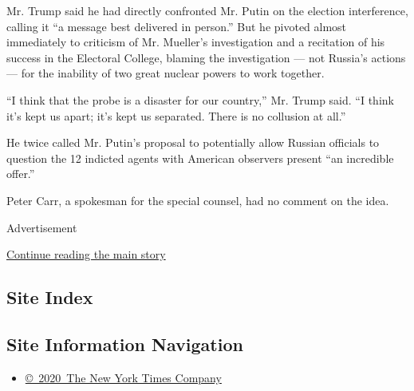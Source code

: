 Mr. Trump said he had directly confronted Mr. Putin on the election
interference, calling it ``a message best delivered in person.'' But he
pivoted almost immediately to criticism of Mr. Mueller's investigation
and a recitation of his success in the Electoral College, blaming the
investigation --- not Russia's actions --- for the inability of two
great nuclear powers to work together.

``I think that the probe is a disaster for our country,'' Mr. Trump
said. ``I think it's kept us apart; it's kept us separated. There is no
collusion at all.''

He twice called Mr. Putin's proposal to potentially allow Russian
officials to question the 12 indicted agents with American observers
present ``an incredible offer.''

Peter Carr, a spokesman for the special counsel, had no comment on the
idea.

Advertisement

\protect\hyperlink{after-bottom}{Continue reading the main story}

\hypertarget{site-index}{%
\subsection{Site Index}\label{site-index}}

\hypertarget{site-information-navigation}{%
\subsection{Site Information
Navigation}\label{site-information-navigation}}

\begin{itemize}
\tightlist
\item
  \href{https://help.nytimes.com/hc/en-us/articles/115014792127-Copyright-notice}{©~2020~The
  New York Times Company}
\end{itemize}

